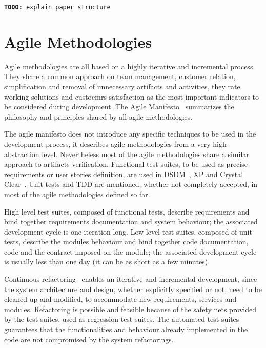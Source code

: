 \documentclass[english]{lni}
\newcommand{\todo}[1]{\texttt{\textbf{TODO:} #1}}
\begin{document}
\todo{explain paper structure}



\section{Agile Methodologies}
\label{sec:agile_methodologies}

Agile methodologies are all based on a highly iterative and incremental process.
They share a common approach on team management, customer relation, simplification and removal of unnecessary artifacts and activities, they rate working solutions and custoemrs satisfaction as the most important indicators to be considered during development.
The Agile Manifesto~\cite{Beck2001} summarizes the philosophy and principles shared by all agile methodologies.

The agile manifesto does not introduce any specific techniques to be used in the development process, it describes agile methodologies from a very high abstraction level.
Nevertheless most of the agile methodologies share a similar approach to artifacts verification.
Functional test suites, to be used as precise requirements or user stories definition, are used in DSDM~\cite{Stapleton1997}, XP and Crystal Clear~\cite{Cockburn2004}. 
Unit tests and TDD are mentioned, whether not completely accepted, in most of the agile methodologies defined so far.

High level test suites, composed of functional tests, describe requirements and bind together requirements documentation and system behaviour; the associated development cycle is one iteration long. 
Low level test suites, composed of unit tests, describe the modules behaviour and bind together code documentation, code and the contract imposed on the module; the associated development cycle is usually less than one day (it can be as short as a few minutes).

Continuous refactoring~\cite{Fowler1999} enables an iterative and incremental development, since the system architecture and design, whether explicitly specified or not, need to be cleaned up and modified, to accommodate new requirements, services and modules.
Refactoring is possible and feasible because of the safety nets provided by the test suites, used as regression test suites.
The automated test suites guarantees that the functionalities and behaviour already implemented in the code are not compromised by the system refactorings.
\end{document}
